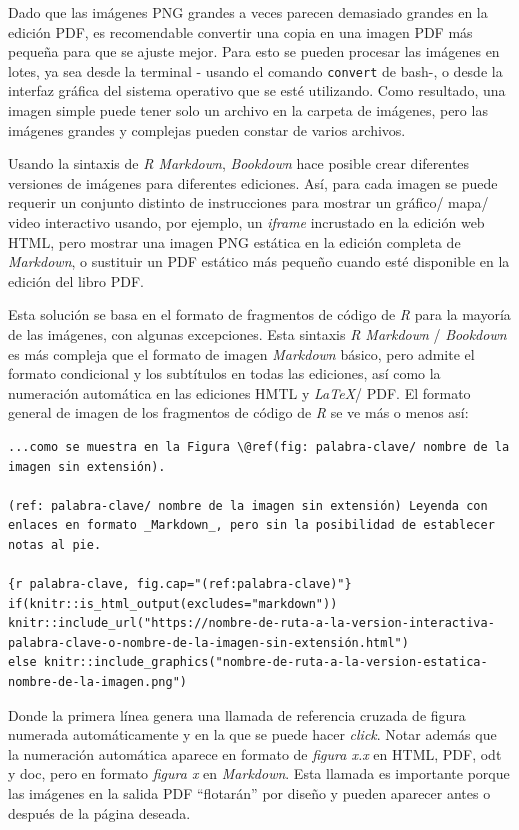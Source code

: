 \documentclass[
]{krantz}
\begin{document}
Dado que las imágenes PNG grandes a veces parecen demasiado grandes en la edición PDF, es recomendable convertir una copia en una imagen PDF más pequeña para que se ajuste mejor. Para esto se pueden procesar las imágenes en lotes, ya sea desde la terminal - usando el comando \texttt{convert} de bash-, o desde la interfaz gráfica del sistema operativo que se esté utilizando. Como resultado, una imagen simple puede tener solo un archivo en la carpeta de imágenes, pero las imágenes grandes y complejas pueden constar de varios archivos.

Usando la sintaxis de \emph{R Markdown}, \emph{Bookdown} hace posible crear diferentes versiones de imágenes para diferentes ediciones. Así, para cada imagen se puede requerir un conjunto distinto de instrucciones para mostrar un gráfico/ mapa/ video interactivo usando, por ejemplo, un \emph{iframe} incrustado en la edición web HTML, pero mostrar una imagen PNG estática en la edición completa de \emph{Markdown}, o sustituir un PDF estático más pequeño cuando esté disponible en la edición del libro PDF.

Esta solución se basa en el formato de fragmentos de código de \emph{R} para la mayoría de las imágenes, con algunas excepciones. Esta sintaxis \emph{R Markdown} / \emph{Bookdown} es más compleja que el formato de imagen \emph{Markdown} básico, pero admite el formato condicional y los subtítulos en todas las ediciones, así como la numeración automática en las ediciones HMTL y \emph{LaTeX}/ PDF. El formato general de imagen de los fragmentos de código de \emph{R} se ve más o menos así:

\begin{verbatim}
...como se muestra en la Figura \@ref(fig: palabra-clave/ nombre de la imagen sin extensión).

(ref: palabra-clave/ nombre de la imagen sin extensión) Leyenda con enlaces en formato _Markdown_, pero sin la posibilidad de establecer notas al pie.

{r palabra-clave, fig.cap="(ref:palabra-clave)"}
if(knitr::is_html_output(excludes="markdown")) knitr::include_url("https://nombre-de-ruta-a-la-version-interactiva-palabra-clave-o-nombre-de-la-imagen-sin-extensión.html")
else knitr::include_graphics("nombre-de-ruta-a-la-version-estatica-nombre-de-la-imagen.png")
\end{verbatim}

Donde la primera línea genera una llamada de referencia cruzada de figura numerada automáticamente y en la que se puede hacer \emph{click}. Notar además que la numeración automática aparece en formato de \emph{figura x.x} en HTML, PDF, odt y doc, pero en formato \emph{figura x} en \emph{Markdown}. Esta llamada es importante porque las imágenes en la salida PDF ``flotarán'' por diseño y pueden aparecer antes o después de la página deseada.
\end{document}
